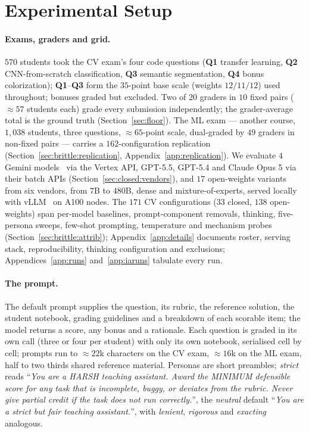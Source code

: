 \section{Experimental Setup}
\label{sec:setup}

\paragraph{Exams, graders and grid.}
$570$ students took the CV exam's four code questions (\textbf{Q1} transfer learning, \textbf{Q2} CNN-from-scratch classification, \textbf{Q3} semantic segmentation, \textbf{Q4} bonus colorization); \textbf{Q1}--\textbf{Q3} form the $35$-point base scale (weights $12/11/12$) used throughout; bonuses graded but excluded. Two of $20$ graders in $10$ fixed pairs ($\approx 57$ students each) grade every submission independently; the grader-average total is the ground truth (Section~\ref{sec:floor}). The ML exam --- another course, $1{,}038$ students, three questions, $\approx 65$-point scale, dual-graded by $49$ graders in non-fixed pairs --- carries a $162$-configuration replication (Section~\ref{sec:brittle:replication}, Appendix~\ref{app:replication}). We evaluate $4$ Gemini models~\citep{geminiteam2025geminifamilyhighlycapable,comanici2025gemini25pushingfrontier} via the Vertex API, GPT-5.5, GPT-5.4 and Claude Opus 5 via their batch APIs (Section~\ref{sec:closed:vendors}), and $17$ open-weights variants from six vendors, from $7$B to $480$B, dense and mixture-of-experts, served locally with vLLM~\citep{kwon2023efficientmemorymanagementlarge} on A100 nodes. The $171$ CV configurations ($33$ closed, $138$ open-weights) span per-model baselines, prompt-component removals, thinking, five-persona sweeps, few-shot prompting, temperature and mechanism probes (Section~\ref{sec:brittle:attrib}); Appendix~\ref{app:details} documents roster, serving stack, reproducibility, thinking configuration and exclusions; Appendices~\ref{app:runs} and~\ref{app:iaruns} tabulate every run.

\paragraph{The prompt.}
The default prompt supplies the question, its rubric, the reference solution, the student notebook, grading guidelines and a breakdown of each scorable item; the model returns a score, any bonus and a rationale. Each question is graded in its own call (three or four per student) with only its own notebook, serialised cell by cell; prompts run to $\approx 22$k characters on the CV exam, $\approx 16$k on the ML exam, half to two thirds shared reference material. Personas are short preambles; \emph{strict} reads ``\emph{You are a HARSH teaching assistant. Award the MINIMUM defensible score for any task that is incomplete, buggy, or deviates from the rubric. Never give partial credit if the task does not run correctly.}'', the \emph{neutral} default ``\emph{You are a strict but fair teaching assistant.}'', with \emph{lenient}, \emph{rigorous} and \emph{exacting} analogous.

